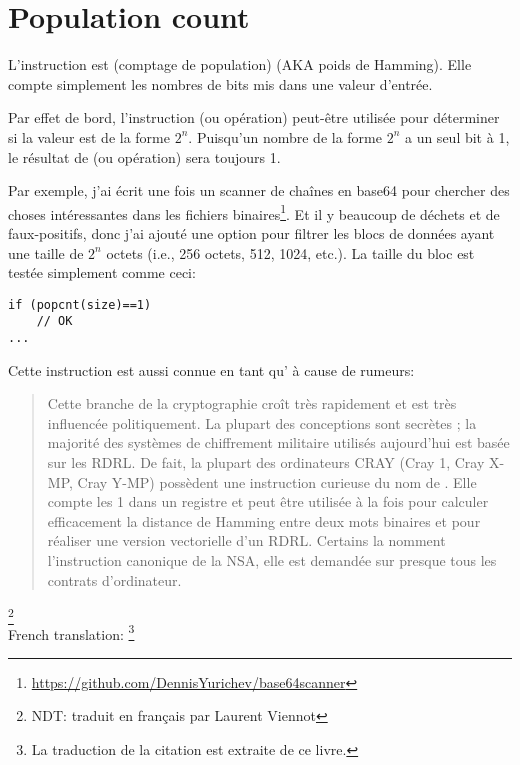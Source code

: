 \section{Population count}
\label{POPCNT}

L'instruction  est  (comptage de population) (\ac{AKA}
poids de Hamming). Elle compte simplement les nombres de bits mis dans une valeur
d'entrée.

Par effet de bord, l'instruction  (ou opération) peut-être utilisée pour
déterminer si la valeur est de la forme $2^n$. Puisqu'un nombre de la forme $2^n$
a un seul bit à 1, le résultat de  (ou opération) sera toujours 1.

Par exemple, j'ai écrit une fois un scanner de chaînes en base64 pour chercher des
choses intéressantes dans les fichiers binaires\footnote{\url{https://github.com/DennisYurichev/base64scanner}}.
Et il y  beaucoup de déchets et de faux-positifs, donc j'ai ajouté une option pour
filtrer les blocs de données ayant une taille de $2^n$ octets (i.e., 256 octets,
512, 1024, etc.).
La taille du bloc est testée simplement comme ceci:

\begin{lstlisting}[style=customc]
if (popcnt(size)==1)
	// OK
...
\end{lstlisting}

Cette instruction est aussi connue en tant qu' à cause de
rumeurs:

\begin{framed}
\begin{quotation}
Cette branche de la cryptographie croît très rapidement et est très influencée politiquement.
La plupart des conceptions sont secrètes ; la majorité des systèmes de chiffrement
militaire utilisés aujourd'hui est basée sur les RDRL. De fait, la plupart des ordinateurs
CRAY (Cray 1, Cray X-MP, Cray Y-MP) possèdent une instruction curieuse du
nom de .
Elle compte les 1 dans un registre et peut être
utilisée à la fois pour calculer efficacement la distance de Hamming entre deux mots
binaires et pour réaliser une version vectorielle d'un RDRL. Certains la nomment
l'instruction canonique de la NSA, elle est demandée sur presque tous les contrats
d'ordinateur.
\end{quotation}
\end{framed}
\InSqBrackets{\Schneier{}}\footnote{NDT: traduit en français par Laurent Viennot}\\
French translation: \footnote{La
traduction de la citation est extraite de ce livre.}


